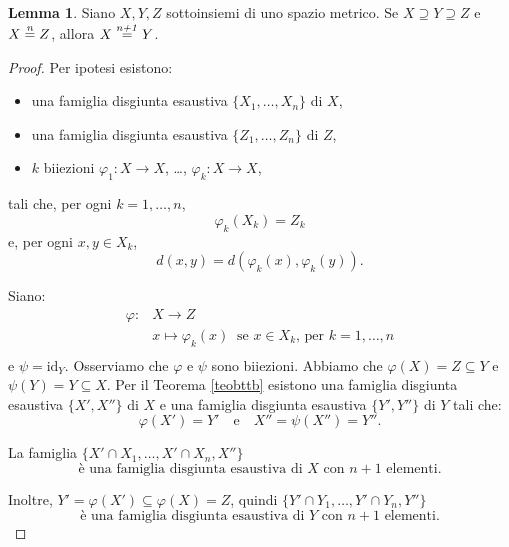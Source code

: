 \documentclass[a4paper,oneside,11pt]{book}
\theoremstyle{definition} \newtheorem{Def}{Definizione}
\theoremstyle{plain} \newtheorem{teo}{Teorema}
\theoremstyle{plain} \newtheorem{cor}[teo]{Corollario}
\theoremstyle{definition} \newtheorem{lem}[teo]{Lemma}
\theoremstyle{plain} \newtheorem{pro}[teo]{Proposizione}
\newcommand{\eqn}[1]{\stackrel{\text{\textit{#1}}}{=}}
\begin{document}
	
	\begin{lem}\label{sierlemxyz}
		Siano $X,Y,Z$ sottoinsiemi di uno spazio metrico. Se $ X \supseteq Y \supseteq Z$ e $X \eqn{n} Z$, allora $X \eqn{n+1} Y$.
	\end{lem}
	
	\begin{proof}
		Per ipotesi esistono:
		\begin{itemize}
			\item una famiglia disgiunta esaustiva $\{X_1, \dots, X_n\}$ di $X$,
			\item una famiglia disgiunta esaustiva $\{Z_1, \dots, Z_n\}$ di $Z$,
			\item $k$ biiezioni $\varphi_1 : X \to X$, \dots, $\varphi_k : X \to X$,
		\end{itemize}
		tali che, per ogni $k =1, \dots, n$,
		\begin{equation}\label{sierlemxyz1} %
			\varphi_k(X_k) = Z_k
		\end{equation}
		e, per ogni $x,y \in X_k$,
		\begin{equation}\label{sierlemxyz2}
			d(x,y) = d(\varphi_k(x), \varphi_k(y)) \text{.}
		\end{equation}
		
		Siano:
		\begin{equation*}
			\begin{aligned}
				\varphi: &X \to Z\\
				&x \mapsto \varphi_k(x)\ \text{ se $x \in X_k$, per $k = 1, \dots, n$}\\
			\end{aligned}
		\end{equation*}
		e $\psi = \text{id}_Y$.
		Osserviamo che $\varphi$ e $\psi$ sono biiezioni. Abbiamo che $\varphi(X) = Z \subseteq Y$ e $\psi(Y) = Y \subseteq X$. Per il Teorema \ref{teobttb} esistono una famiglia disgiunta esaustiva $\{X', X''\}$ di $X$ e una famiglia disgiunta esaustiva $\{Y', Y''\}$ di $Y$ tali che:
		\begin{equation*}
			\varphi(X') = Y' \quad \text{e} \quad X'' = \psi(X'') = Y'' \text{.}
		\end{equation*}
		
		La famiglia $\{X' \cap X_1, \dots, X' \cap X_n, X''\}$
		\begin{equation}\label{sierlemxyz3}
			\text{è una famiglia disgiunta esaustiva di $X$ con $n+1$ elementi.}
		\end{equation}
		
		Inoltre, $Y' = \varphi(X') \subseteq \varphi(X) = Z$, quindi $\{Y' \cap Y_1, \dots, Y' \cap Y_n, Y''\}$
		\begin{equation}\label{sierlemxyz4}
			 \text{è una  famiglia disgiunta esaustiva di $Y$ con $n+1$ elementi.}
		\end{equation}
		

\end{proof}
\end{document}

